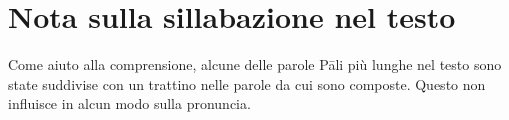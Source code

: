 \section{Nota sulla sillabazione nel testo}

Come aiuto alla comprensione, alcune delle parole Pāli più lunghe nel testo sono state
suddivise con un trattino nelle parole da cui sono composte. Questo non influisce
in alcun modo sulla pronuncia.


